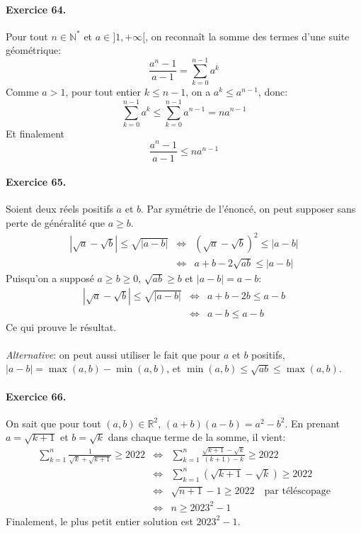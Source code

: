 \paragraph{Exercice 64.} Pour tout $n\in\mathbb{N}^*$ et $a\in]1,+\infty[$, on reconnaît la somme des termes d'une suite géométrique:
\[
\frac{a^n-1}{a-1} = \sum_{k=0}^{n-1}{a^k}
\]
Comme $a>1$, pour tout entier $k\leq n-1$, on a $a^k\leq a^{n-1}$, donc:
\[
\sum_{k=0}^{n-1}{a^k} \leq \sum_{k=0}^{n-1}{a^{n-1}} = na^{n-1}
\] 
Et finalement
\[
\frac{a^n-1}{a-1}  \leq na^{n-1}
\] 

\paragraph{Exercice 65.} Soient deux réels positifs $a$ et $b$. Par symétrie de l’énoncé, on peut supposer sans perte de généralité que $a\geq b$.
\begin{eqnarray}
  \left| \sqrt{a}-\sqrt{b} \right| \leq \sqrt{|a-b|} &\Leftrightarrow &  \left( \sqrt{a}-\sqrt{b} \right)^2 \leq |a-b| \nonumber \\
   &\Leftrightarrow &  a+b-2\sqrt{ab} \leq |a-b| \nonumber 
\end{eqnarray}
Puisqu'on a supposé $a \geq b \geq 0$, $\sqrt{ab}\geq b$ et $|a-b|=a-b$:
\begin{eqnarray}
  \left| \sqrt{a}-\sqrt{b} \right| \leq \sqrt{|a-b|} &\Leftrightarrow &  a+b-2b \leq a-b \nonumber \\
  &\Leftrightarrow &  a-b \leq a-b \nonumber
\end{eqnarray}
Ce qui prouve le résultat.\\ \\
\textit{Alternative}: on peut aussi utiliser le fait que pour $a$ et $b$ positifs, $|a-b|=\max(a,b)-\min(a,b)$, et $\min(a,b) \leq \sqrt{ab} \leq \max(a,b)$.
 
\paragraph{Exercice 66.} On sait que pour tout $(a,b)\in\mathbb{R}^2$, $(a+b)(a-b)=a^2-b^2$. En prenant $a=\sqrt{k+1}$ et $b=\sqrt{k}$ dans chaque terme de la somme, il vient:
\begin{eqnarray}
  \sum_{k=1}^n{\frac{1}{\sqrt{k}+\sqrt{k+1}}} \geq 2022 &\Leftrightarrow & \sum_{k=1}^n{\frac{\sqrt{k+1}-\sqrt{k}}{(k+1)-k}} \geq 2022 \nonumber \\
  &\Leftrightarrow & \sum_{k=1}^n{\left(\sqrt{k+1}-\sqrt{k}\right)} \geq 2022 \nonumber \\
  &\Leftrightarrow &  \sqrt{n+1} - 1 \geq 2022 \quad \textrm{par téléscopage}\nonumber \\
  &\Leftrightarrow &  n\geq 2023^2-1 \nonumber 
\end{eqnarray}
 Finalement, le plus petit entier solution est $2023^2-1$.

